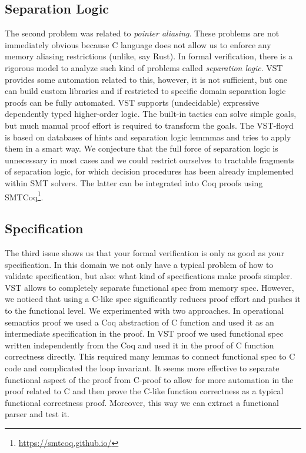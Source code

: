 \documentclass{article}
\begin{document}
\subsection{Separation Logic}

The second problem was related to \textit{pointer aliasing}. These problems are not immediately obvious because C language does not allow us to enforce any memory aliasing restrictions (unlike, say Rust). In formal verification, there is a rigorous model to analyze such kind of problems called \textit{separation logic}. VST provides some automation related to this, however, it is not sufficient, but one can build custom libraries and if restricted to specific domain separation logic proofs can be fully automated. VST supports (undecidable) expressive dependently typed higher-order logic. The built-in tactics can solve simple goals, but much manual proof effort is required to transform the goals. The VST-floyd is based on databases of hints and separation logic lemmmas and tries to apply them in a smart way. We conjecture that the full force of separation logic is unnecessary in most cases and we could restrict ourselves to tractable fragments of separation logic, for which decision procedures has been already implemented within SMT solvers. The latter can be integrated into Coq proofs using SMTCoq\footnote{\url{https://smtcoq.github.io/}}.

\subsection{Specification}

The third issue shows us that your formal verification is only as good as your specification. In this domain we not only have a typical problem of how to validate specification, but also: what kind of specifications make proofs simpler. VST allows to completely separate functional spec from memory spec. However, we noticed that using a C-like spec significantly reduces proof effort and pushes it to the functional level. We experimented with two approaches. In operational semantics proof we used a Coq abstraction of C function and used it as an intermediate specification in the proof. In VST proof we used functional spec written independently from the Coq and used it in the proof of C function correctness directly. This required many lemmas to connect functional spec to C code and complicated the loop invariant. It seems more effective to separate functional aspect of the proof from C-proof to allow for more automation in the proof related to C and then prove the C-like function correctness as a typical functional correctness proof. Moreover, this way we can extract a functional parser and test it.
\end{document}
